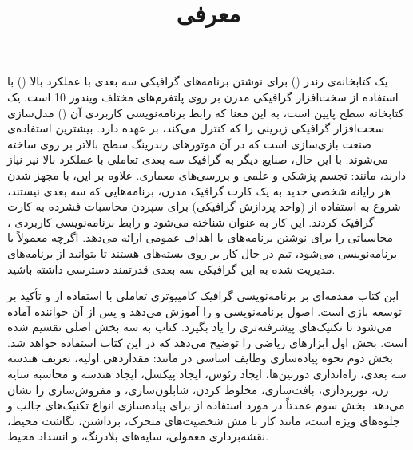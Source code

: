 \newpage

\textbf{\vspace{80pt}}
\title{
    \BTitr
    \center \Huge
    \begin{flushright}
        \textbf{معرفی}
    \end{flushright}
}
\textbf{\vspace{80pt}}

{
    \Large
     یک کتابخانه‌ی رندر () برای نوشتن برنامه‌های گرافیکی سه بعدی با عملکرد بالا () با استفاده از سخت‌افزار گرافیکی مدرن بر روی پلتفرم‌های مختلف ویندوز 10  است.
 یک کتابخانه سطح پایین است، به این معنا که رابط برنامه‌نویسی کاربردی آن () مدل‌سازی سخت‌افزار گرافیکی زیرینی را که کنترل می‌کند، بر عهده دارد.
بیشترین استفاده‌ی  صنعت بازی‌سازی است که در آن موتور‌های رندرینگ سطح بالاتر بر روی  ساخته می‌شوند.
با این حال، صنایع دیگر به گرافیک سه بعدی تعاملی با عملکرد بالا نیز نیاز دارند، مانند: تجسم پزشکی و علمی و بررسی‌های معماری.
علاوه بر این، با مجهز شدن هر رایانه شخصی جدید به یک کارت گرافیک مدرن، برنامه‌هایی که سه بعدی نیستند، شروع به استفاده از  (واحد پردازش گرافیکی) برای سپردن محاسبات فشرده به کارت گرافیک کردند.
این کار به عنوان  شناخته می‌شود و رابط برنامه‌نویسی کاربردی ،  محاسباتی را برای نوشتن برنامه‌های  با اهداف عمومی ارائه می‌دهد.
اگرچه  معمولاً با  برنامه‌نویسی می‌شود، تیم  در حال کار بر روی بسته‌های  هستند تا بتوانید از برنامه‌های مدیریت شده به این  گرافیکی سه بعدی قدرتمند دسترسی داشته باشید.
}

{
    \Large
    این کتاب مقدمه‌ای بر برنامه‌نویسی گرافیک کامپیوتری تعاملی با استفاده از  و تأکید بر توسعه بازی است. اصول برنامه‌نویسی  و  را آموزش می‌دهد و پس از آن خواننده آماده می‌شود تا تکنیک‌های پیشرفته‌تری را یاد بگیرد.
    کتاب به سه بخش اصلی تقسیم شده است. بخش اول ابزار‌های ریاضی را توضیح می‌دهد که در این کتاب استفاده خواهد شد.
    بخش دوم نحوه پیاده‌سازی وظایف اساسی در  مانند: مقداردهی اولیه، تعریف هندسه سه بعدی، راه‌اندازی دوربین‌ها، ایجاد رئوس، ایجاد پیکسل، ایجاد هندسه و محاسبه سایه زن، نورپردازی، بافت‌سازی، مخلوط کردن، شابلون‌سازی، و مفروش‌سازی را نشان می‌دهد.
    بخش سوم عمدتاً در مورد استفاده از  برای پیاده‌سازی انواع تکنیک‌های جالب و جلوه‌های ویژه است، مانند کار با مش شخصیت‌های متحرک، برداشتن، نگاشت محیط، نقشه‌برداری معمولی، سایه‌های بلادرنگ، و انسداد محیط.
}

